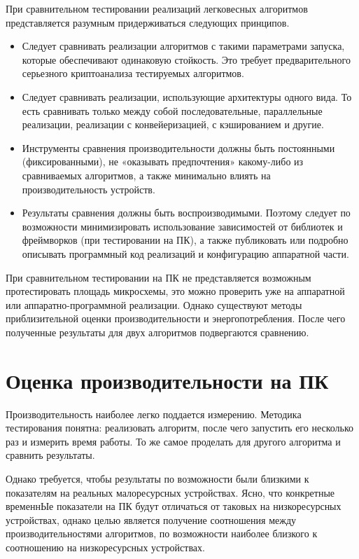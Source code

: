 При сравнительном тестировании реализаций легковесных алгоритмов представляется разумным придерживаться следующих принципов.
\begin{itemize}
	\item Следует сравнивать реализации алгоритмов с такими параметрами запуска, которые обеспечивают одинаковую стойкость. Это требует предварительного серьезного криптоанализа тестируемых алгоритмов.
	\item Следует сравнивать реализации, использующие архитектуры одного вида. То есть сравнивать только между собой последовательные, параллельные реализации, реализации с конвейеризацией, с кэшированием и другие.
	\item Инструменты сравнения производительности должны быть постоянными (фиксированными), не «оказывать предпочтения» какому-либо из сравниваемых алгоритмов, а также минимально влиять на производительность устройств.
	\item Результаты сравнения должны быть воспроизводимыми. Поэтому следует по возможности минимизировать использование зависимостей от библиотек и фреймворков (при тестировании на ПК), а также публиковать или подробно описывать программный код реализаций и конфигурацию аппаратной части.
\end{itemize}

При сравнительном тестировании на ПК не представляется возможным протестировать площадь микросхемы, это можно проверить уже на аппаратной или аппаратно-программной реализации. Однако существуют методы приблизительной оценки производительности и энергопотребления. После чего полученные результаты для двух алгоритмов подвергаются сравнению.

\section{Оценка производительности на ПК} \label{ch3:sec2}

Производительность наиболее легко поддается измерению. Методика тестирования понятна: реализовать алгоритм, после чего запустить его несколько раз и измерить время работы. То же самое проделать для другого алгоритма и сравнить результаты.

Однако требуется, чтобы результаты по возможности были близкими к показателям на реальных малоресурсных устройствах. Ясно, что конкретные временнЫе показатели на ПК будут отличаться от таковых на низкоресурсных устройствах, однако целью является получение соотношения между производительностями алгоритмов, по возможности наиболее близкого к соотношению на низкоресурсных устройствах.

